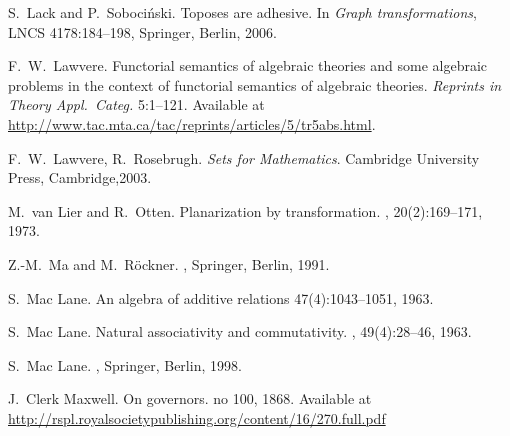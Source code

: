 \begin{thebibliography}{RSW00}
    S.\ Lack and P.\ Soboci\'nski. 
    \newblock Toposes are adhesive. 
    \newblock In {\em Graph transformations}, LNCS 4178:184--198,
    Springer, Berlin, 2006.

    F.\ W.\ Lawvere.
    \newblock Functorial semantics of algebraic theories and
    some algebraic problems in the context of functorial semantics of algebraic
    theories.
    \newblock \textsl{Reprints in Theory Appl.\ Categ.} { 5}:1--121.
    \newblock 
    Available at
    \href{http://www.tac.mta.ca/tac/reprints/articles/5/tr5abs.html}
    {http://www.tac.mta.ca/tac/reprints/articles/5/tr5abs.html}.

    F.\ W.\ Lawvere, R.\ Rosebrugh.
    \newblock \emph{Sets for Mathematics}.
    Cambridge University Press, Cambridge,2003.

    M.\ van Lier and R.\ Otten.
    \newblock Planarization by transformation.
    , { 20}(2):169--171, 1973.

    Z.-M.\ Ma and M.\ R\"ockner.
    , Springer, Berlin, 1991.
    
    S.\ Mac Lane.
    \newblock An algebra of additive relations
     { 47}(4):1043--1051, 1963. 

    S.\ Mac Lane.
    \newblock Natural associativity and commutativity.
    , { 49}(4):28--46, 1963. 


    S.\ Mac Lane.
    ,
    Springer, Berlin, 1998.
    
    J.\ Clerk Maxwell. 
    \newblock On governors.
     no{ 100}, 1868. 
    \newblock Available at \href{http://rspl.royalsocietypublishing.org/content/16/270.full.pdf}{http://rspl.royalsocietypublishing.org/content/16/270.full.pdf}
    

\end{thebibliography}
